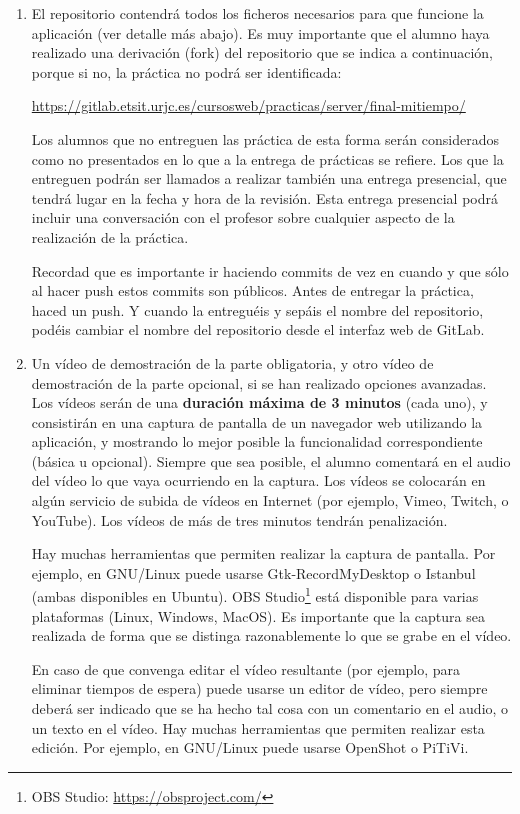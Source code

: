 \begin{enumerate}
  \item El repositorio contendrá todos los ficheros necesarios para que funcione la aplicación (ver detalle más abajo). Es muy importante que el alumno haya realizado una derivación (fork) del repositorio que se indica a continuación, porque si no, la práctica no podrá ser identificada: 

\url{https://gitlab.etsit.urjc.es/cursosweb/practicas/server/final-mitiempo/}

Los alumnos que no entreguen las práctica de esta forma serán considerados como no presentados en lo que a la entrega de prácticas se refiere. Los que la entreguen podrán ser llamados a realizar también una entrega presencial, que tendrá lugar en la fecha y hora de la revisión. Esta entrega presencial podrá incluir una conversación con el profesor sobre cualquier aspecto de la realización de la práctica.

Recordad que es importante ir haciendo commits de vez en cuando y que sólo al hacer push estos commits son públicos. Antes de entregar la práctica, haced un push. Y cuando la entreguéis y sepáis el nombre del repositorio, podéis cambiar el nombre del repositorio desde el interfaz web de GitLab. 
 
 \item Un vídeo de demostración de la parte obligatoria, y otro vídeo de demostración de la parte opcional, si se han realizado opciones avanzadas. Los vídeos serán de una {\bf duración máxima de 3 minutos} (cada uno), y consistirán en una captura de pantalla de un navegador web utilizando la aplicación, y mostrando lo mejor posible la funcionalidad correspondiente (básica u opcional). Siempre que sea posible, el alumno comentará en el audio del vídeo lo que vaya ocurriendo en la captura. Los vídeos se colocarán en algún servicio de subida de vídeos en Internet (por ejemplo, Vimeo, Twitch, o YouTube). Los vídeos de más de tres minutos tendrán penalización.

Hay muchas herramientas que permiten realizar la captura de pantalla. Por ejemplo, en GNU/Linux puede usarse Gtk-RecordMyDesktop o Istanbul (ambas disponibles en Ubuntu). OBS Studio\footnote{OBS Studio: \url{https://obsproject.com/}} está disponible para varias plataformas (Linux, Windows, MacOS). Es importante que la captura sea realizada de forma que se distinga razonablemente lo que se grabe en el vídeo.

En caso de que convenga editar el vídeo resultante (por ejemplo, para eliminar tiempos de espera) puede usarse un editor de vídeo, pero siempre deberá ser indicado que se ha hecho tal cosa con un comentario en el audio, o un texto en el vídeo. Hay muchas herramientas que permiten realizar esta edición. Por ejemplo, en GNU/Linux puede usarse OpenShot o PiTiVi.


\end{enumerate}
